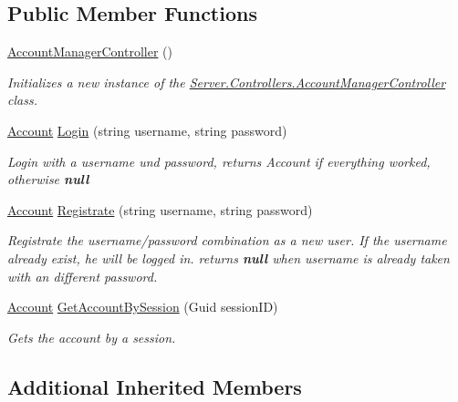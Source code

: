 \subsection*{Public Member Functions}
\begin{DoxyCompactItemize}
\item 
\hyperlink{classServer_1_1Controllers_1_1AccountManagerController_a59e6646da8a2545c87f665f8ecd4179e}{Account\+Manager\+Controller} ()
\begin{DoxyCompactList}\small\item\em Initializes a new instance of the \hyperlink{classServer_1_1Controllers_1_1AccountManagerController}{Server.\+Controllers.\+Account\+Manager\+Controller} class. \end{DoxyCompactList}\item 
\hyperlink{classCore_1_1Models_1_1Account}{Account} \hyperlink{classServer_1_1Controllers_1_1AccountManagerController_ae290a06ee465aca4b38a7cd61c304a26}{Login} (string username, string password)
\begin{DoxyCompactList}\small\item\em Login with a username und password, returns Account if everything worked, otherwise {\bfseries null} \end{DoxyCompactList}\item 
\hyperlink{classCore_1_1Models_1_1Account}{Account} \hyperlink{classServer_1_1Controllers_1_1AccountManagerController_aa78f40e7fdfcc38730c4fe118b52b5eb}{Registrate} (string username, string password)
\begin{DoxyCompactList}\small\item\em Registrate the username/password combination as a new user. If the username already exist, he will be logged in. returns {\bfseries null} when username is already taken with an different password. \end{DoxyCompactList}\item 
\hyperlink{classCore_1_1Models_1_1Account}{Account} \hyperlink{classServer_1_1Controllers_1_1AccountManagerController_afd9fd2cdd749a94178834540c91ceef4}{Get\+Account\+By\+Session} (Guid session\+I\+D)
\begin{DoxyCompactList}\small\item\em Gets the account by a session. \end{DoxyCompactList}\end{DoxyCompactItemize}
\subsection*{Additional Inherited Members}


